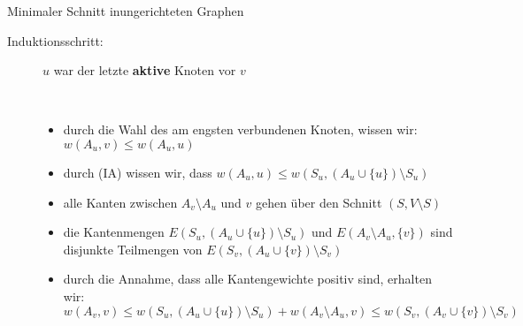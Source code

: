 \begin{TOPbreak}{Minimaler Schnitt in}{ungerichteten Graphen}
\begin{itemize}
\begin{enumerate}
\begin{description}
					\item[Induktionsschritt:] $u$ war der letzte \textbf{aktive} Knoten vor $v$\\
						\vspace*{-5\baselineskip}
					\vspace*{-6.5\baselineskip}\item[]\ \\
					\begin{itemize}
						\item durch die Wahl des am engsten verbundenen Knoten, wissen wir: $w(A_u,v)\leq w(A_u,u)$
						\item durch (IA) wissen wir, dass $w(A_u,u)\leq w(S_u,(A_u \cup \{u\})\setminus S_u)$
						\item alle Kanten zwischen $A_v\setminus A_u$ und $v$ gehen über den Schnitt $(S,V\setminus S)$
						\item die Kantenmengen $E(S_u,(A_u \cup \{u\})\setminus S_u)$ und $E(A_v\setminus A_u, \{v\})$ sind disjunkte Teilmengen von $E(S_v,(A_u \cup \{v\})\setminus S_v)$
						\item durch die Annahme, dass alle Kantengewichte positiv sind, erhalten wir:\\$w(A_v,v)\leq w(S_u,(A_u \cup \{u\})\setminus S_u) + w(A_v\setminus A_u,v) \leq w(S_v,(A_v\cup\{v\})\setminus S_v)$
					\end{itemize}
				\end{description}
		\end{enumerate}
	\end{itemize}
\end{TOPbreak}